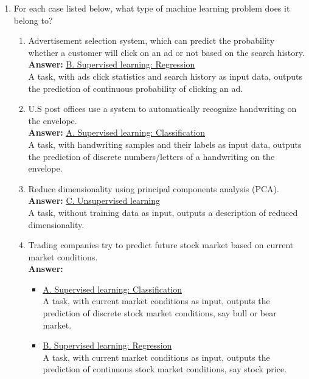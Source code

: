 \documentclass{article}
\begin{document}
\begin{enumerate}
	\item For each case listed below, what type of machine learning problem does it belong to?
	\begin{enumerate}
		\item Advertisement selection system, which can predict the probability whether a customer will click on an ad or not based on the search history. \\
		\textbf{Answer:}
		\underline{B. Supervised learning: Regression}\\
		A task, with ads click statistics and search history as input data, outputs the prediction of continuous probability of clicking an ad.
		\item U.S post offices use a system to automatically recognize handwriting on the envelope. \\
		\textbf{Answer:}
		\underline{A. Supervised learning: Classification}\\
		A task, with handwriting samples and their labels as input data, outputs the prediction of discrete numbers/letters of a handwriting on the envelope.
		\item Reduce dimensionality using principal components analysis (PCA). \\
		\textbf{Answer:}
		\underline{C. Unsupervised learning}\\
		A task, without training data as input, outputs a description of reduced dimensionality. 
		\item Trading companies try to predict future stock market based on current market conditions. \\
		\textbf{Answer:}
		\begin{itemize}
			\item \underline{A. Supervised learning: Classification}\\
			A task, with current market conditions as input, outputs the prediction of discrete stock market conditions, say bull or bear market.
			\item \underline{B. Supervised learning: Regression}\\
			A task, with current market conditions as input, outputs the prediction of continuous stock market conditions, say stock price.
		\end{itemize}
		

\end{enumerate}
\end{enumerate}
\end{document}
